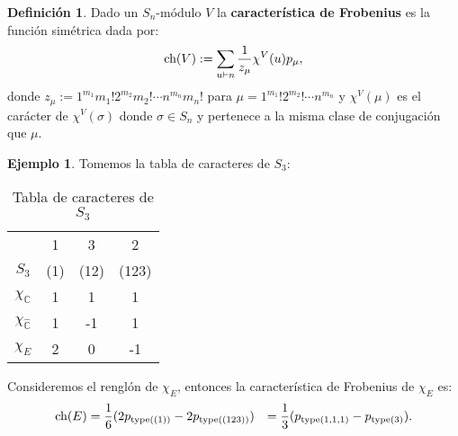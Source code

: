 \documentclass[12pt]{book}
\theoremstyle{definition}
\newtheorem{definition}[theorem]{Definición}
\newtheorem{example}[theorem]{Ejemplo}
\newcounter{in}
\newcounter{ini}
\begin{document}
\begin{definition}
Dado un $S_n$-módulo $V$ la \textbf{característica de Frobenius} es la
función simétrica dada por:
\begin{equation}
  \label{eq:104}
  \textup{ch}(V) := \sum_{u \vdash n}  \frac{1}{z_{\mu}} \chi^{V}(u) p_{\mu},
\end{equation}
donde $z_{\mu} := 1^{m_1} m_{1}! 2^{m_2} m_{2}! \cdots n^{m_n} m_{n}!$
para $\mu = 1^{m_1} ! 2^{m_2}! \cdots n^{m_n}$ y $\chi^{V}(\mu)$ es el
carácter de $\chi^{V}(\sigma)$ donde $\sigma \in S_n$ y pertenece a la
misma clase de conjugación que $\mu$.
\end{definition}
\begin{example}
Tomemos la tabla de caracteres de $S_{3}$:
\begin{table}[H]
  \centering
  \begin{tabular}{ c| c c c}
      & 1 & 3 & 2 \\
      $S_{3}$ & (1) & (12) & (123) \\
      \hline
      $\chi_{\mathbb{C}}$ & 1 & 1 & 1 \\
      $\chi_{\mathbb{\hat C}}$ & 1 & -1 & 1 \\
      $\chi_{E}$ & 2 & 0 & -1 
    \end{tabular}
    
  \caption{Tabla de caracteres de $S_{3}$}
  \label{tabla-car-S3_1}
\end{table} 
Consideremos el renglón de $\chi_{E}$, entonces la característica de Frobenius de $\chi_{E}$ es:
\begin{equation}
\begin{aligned}
\textup{ch}(E)&=\frac{1}{6}(2p_{\textup{type}((1))}-2p_{\textup{type}((123))})
& = \frac{1}{3}(p_{\textup{type}(1,1,1)}-p_{\textup{type}(3)}).
\end{aligned}
\end{equation} 
\end{example}
\end{document}
